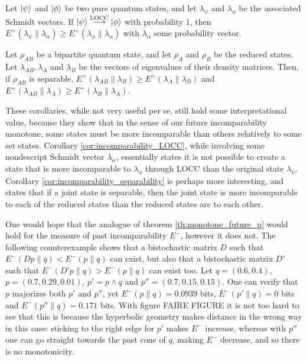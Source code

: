 \begin{corollary} \label{cor:incomparability_LOCC}
    Let $\ket{\psi}$ and $\ket{\phi}$ be two pure quantum states, and let $\lambda_\psi$ and $\lambda_\phi$ be the associated Schmidt vectors. If $\ket{\psi} \overset{\text{LOCC}}{\longrightarrow} \ket{\phi}$ with probability 1, then $E^+ (\lambda_\psi \parallel \lambda_\alpha) \geq E^+ (\lambda_\phi \parallel \lambda_\alpha)$ with $\lambda_\alpha$ some probability vector.
\end{corollary}

\begin{corollary} \label{cor:incomparability_separability}
    Let $\rho_{AB}$ be a bipartite quantum state, and let $\rho_A$ and $\rho_B$ be the reduced states. Let $\lambda_{AB}, \lambda_A$ and $\lambda_B$ be the vectors of eigenvalues of their density matrices. Then, if $\rho_{AB}$ is separable, $E^+ (\lambda_{AB} \parallel \lambda_B) \geq E^+ (\lambda_A \parallel \lambda_B)$ and $E^+ (\lambda_{AB} \parallel \lambda_A) \geq E^+ (\lambda_B \parallel \lambda_A)$.
\end{corollary}

These corollaries, while not very useful per se, still hold some interpretational value, because they show that in the sense of our future incomparability monotone, some states must be more incomparable than others relatively to some set states. Corollary \ref{cor:incomparability_LOCC}, while involving some nondescript Schmidt vector $\lambda_\alpha$, essentially states it is not possible to create a state that is more incomparable to $\lambda_\alpha$ through LOCC than the original state $\lambda_\psi$. Corollary \ref{cor:incomparability_separability} is perhaps more interesting, and states that if a joint state is separable, then the joint state is more incomparable to each of the reduced states than the reduced states are to each other.

One would hope that the analogue of theorem \ref{th:monotone_future_p} would hold for the measure of past incomparability $E^-$, however it does not. The following counterexample shows that a bistochastic matrix $D$ such that $E^- (Dp \parallel q) < E^- (p \parallel q)$ can exist, but also that a bistochastic matrix $D'$ such that $E^- (D'p \parallel q) > E^- (p \parallel q)$ can exist too. Let $q = (0.6, 0.4)$, $p = (0.7, 0.29, 0.01)$, $p' = p \wedge q$ and $p'' = (0.7, 0.15, 0.15)$. One can verify that $p$ majorizes both $p'$ and $p''$, yet $E^- (p \parallel q) = 0.0939$ bits, $E^- (p' \parallel q) = 0$ bits and $E^- (p'' \parallel q) = 0.171$ bits. With figure FAIRE FIGURE it is not too hard to see that this is because the hyperbolic geometry makes distance in the wrong way in this case: sticking to the right edge for $p'$ makes $E^-$ increase, whereas with $p''$ one can go straight towards the past cone of $q$, making $E^-$ decrease, and so there is no monotonicity.



